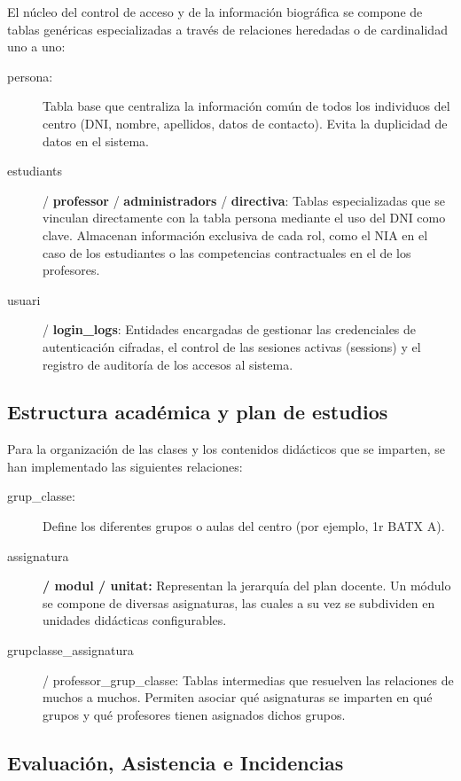 \documentclass[spanish]{report}
\begin{document}
El núcleo del control de acceso y de la información biográfica se
compone de tablas genéricas especializadas a través de relaciones
heredadas o de cardinalidad uno a uno:
\begin{description}
\item [{persona:}] Tabla base que centraliza la información común de todos
los individuos del centro (DNI, nombre, apellidos, datos de contacto).
Evita la duplicidad de datos en el sistema.
\item [{estudiants}] / \textbf{professor} / \textbf{administradors} / \textbf{directiva}:
Tablas especializadas que se vinculan directamente con la tabla persona
mediante el uso del DNI como clave. Almacenan información exclusiva
de cada rol, como el NIA en el caso de los estudiantes o las competencias
contractuales en el de los profesores.
\item [{usuari}] / \textbf{login\_logs}: Entidades encargadas de gestionar
las credenciales de autenticación cifradas, el control de las sesiones
activas (sessions) y el registro de auditoría de los accesos al sistema.
\end{description}

\subsection{Estructura académica y plan de estudios}

Para la organización de las clases y los contenidos didácticos que
se imparten, se han implementado las siguientes relaciones:
\begin{description}
\item [{grup\_classe:}] Define los diferentes grupos o aulas del centro
(por ejemplo, 1r BATX A).
\item [{assignatura}] \textbf{/ modul / unitat:} Representan la jerarquía
del plan docente. Un módulo se compone de diversas asignaturas, las
cuales a su vez se subdividen en unidades didácticas configurables.
\item [{grupclasse\_assignatura}] / professor\_grup\_classe: Tablas intermedias
que resuelven las relaciones de muchos a muchos. Permiten asociar
qué asignaturas se imparten en qué grupos y qué profesores tienen
asignados dichos grupos.
\end{description}

\subsection{Evaluación, Asistencia e Incidencias}
\end{document}
